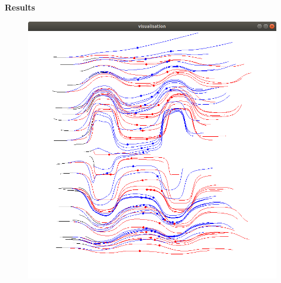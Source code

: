 \documentclass[xcolor=dvipsnames]{beamer}
\begin{document}
\begin{frame}{\bf Results}

\begin{figure}
  \includegraphics[scale=0.25]{../../diagrams/rbc_deep_network_6.png}
\end{figure}

\end{frame}
\end{document}
